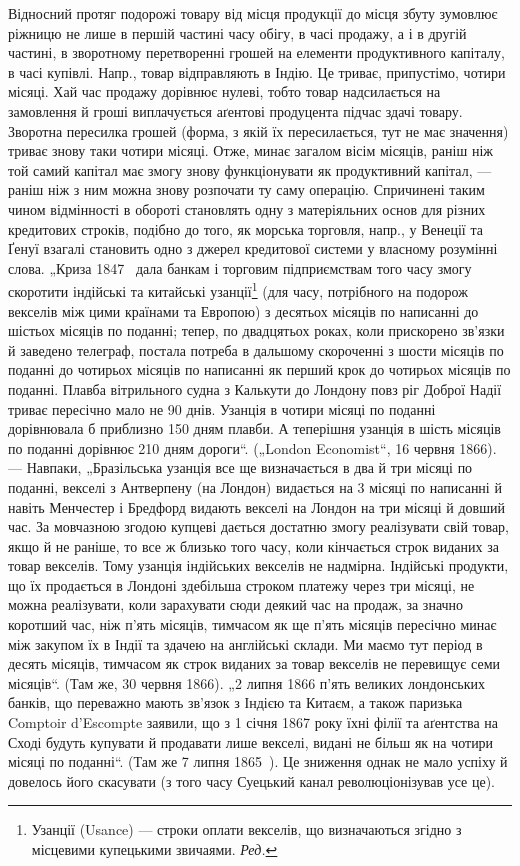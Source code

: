 Відносний протяг подорожі товару від місця продукції до місця
збуту зумовлює ріжницю не лише в першій частині часу обігу, в часі
продажу, а і в другій частині, в зворотному перетворенні грошей
на елементи продуктивного капіталу, в часі купівлі. Напр., товар відправляють
в Індію. Це триває, припустімо, чотири місяці. Хай час продажу
дорівнює нулеві, тобто товар надсилається на замовлення й гроші
виплачується аґентові продуцента підчас здачі товару. Зворотна пересилка
грошей (форма, з якій їх пересилається, тут не має значення) триває
знову таки чотири місяці. Отже, минає загалом вісім місяців, раніш
ніж той самий капітал має змогу знову функціонувати як продуктивний капітал,
— раніш ніж з ним можна знову розпочати ту саму операцію.
Спричинені таким чином відмінності в обороті становлять одну з матеріяльних
основ для різних кредитових строків, подібно до того, як
морська торговля, напр., у Венеції та Ґенуї взагалі становить одно з
джерел кредитової системи у власному розумінні слова. „Криза 1847~
дала банкам і торговим підприємствам того часу змогу скоротити індійські
та китайські узанції\footnote*{
Узанції (Usance) — строки оплати векселів, що визначаються згідно з місцевими
купецькими звичаями. \emph{Ред.}
} (для часу, потрібного на подорож векселів
між цими країнами та Европою) з десятьох місяців по написанні до
шістьох місяців по поданні; тепер, по двадцятьох роках, коли прискорено
зв’язки й заведено телеграф, постала потреба в дальшому скороченні
з шости місяців по поданні до чотирьох місяців по написанні як
перший крок до чотирьох місяців по поданні. Плавба вітрильного судна
з Калькути до Лондону повз ріг Доброї Надії триває пересічно мало
не 90 днів. Узанція в чотири місяці по поданні дорівнювала б приблизно
150 дням плавби. А теперішня узанція в шість місяців по поданні
дорівнює 210 дням дороги“. („London Economist“, 16 червня 1866). —
Навпаки, „Бразільська узанція все ще визначається в два й три місяці
по поданні, векселі з Антверпену (на Лондон) видається на 3 місяці по
написанні й навіть Менчестер і Бредфорд видають векселі на Лондон на
три місяці й довший час. За мовчазною згодою купцеві дається достатню
змогу реалізувати свій товар, якщо й не раніше, то все ж
близько того часу, коли кінчається строк виданих за товар векселів.
Тому узанція індійських векселів не надмірна. Індійські продукти, що
їх продається в Лондоні здебільша строком платежу через три місяці,
не можна реалізувати, коли зарахувати сюди деякий час на продаж, за
значно коротший час, ніж п’ять місяців, тимчасом як ще п’ять місяців
пересічно минає між закупом їх в Індії та здачею на англійські склади.
Ми маємо тут період в десять місяців, тимчасом як строк виданих за
товар векселів не перевищує семи місяців“. (Там же, 30 червня 1866).
„2 липня 1866 п’ять великих лондонських банків, що переважно мають
зв’язок з Індією та Китаєм, а також паризька Comptoir d’Escompte заявили,
що з 1 січня 1867 року їхні філії та аґентства на Сході будуть
купувати й продавати лише векселі, видані не більш як на чотири місяці
по поданні“. (Там же 7 липня 1865~). Це зниження однак не мало
успіху й довелось його скасувати (з того часу Суецький канал революціонізував
усе це).

